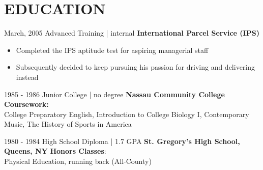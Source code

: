 \documentclass{article}
\begin{document}
\section{EDUCATION}
\begin{entrylist}
 
   \entry
    {March, 2005\enspace}
    {Advanced Training | }{\small{internal}}
    {\normalsize\textbf{\color{ipsgreen}\faMapMarker\space International Parcel Service (IPS)}}
    {\jobspace
    \begin{itemize}[leftmargin=*, itemsep = 0.1em]
    \item Completed the IPS aptitude test for aspiring managerial staff
    \item Subsequently decided to keep pursuing his passion for driving and delivering instead\\
    \end{itemize}}
    
  \entry
    {1985 - 1986\enspace}
    {Junior College | }{\small{no degree}}
    {\normalsize\textbf{\color{ipsgreen}\faMapMarker\space Nassau Community College}}
    {\textbf{Coursework:} \\College Preparatory English, Introduction to College Biology I, Contemporary Music, The History of Sports in America
    \eduspace\\}

  \entry
    {1980 - 1984\enspace}
    {High School Diploma | } {\Large\diameter\thinspace\normalsize 1.7 GPA}
    {\normalsize\textbf{\color{ipsgreen}\faMapMarker\space St. Gregory's High School, Queens, NY}
    }
    {\textbf{Honors Classes}: \\Physical Education, running back (All-County)}\vspace{-2.8mm}
\end{entrylist}
\end{document}
